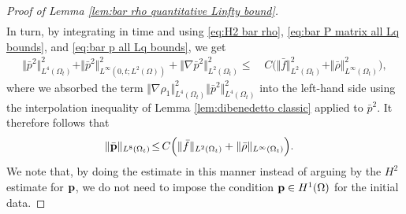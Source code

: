 \documentclass[11pt,a4paper,reqno]{amsart}
\theoremstyle{remark}
\theoremstyle{definition}
\numberwithin{equation}{section}
\newcommand{\p}{{\bf p}}
\begin{document}
\begin{proof}[Proof of Lemma \ref{lem:bar rho quantitative Linfty bound}]
\begin{equation*}
\begin{aligned}
    \end{aligned}
\end{equation*}
In turn, by integrating in time and using \eqref{eq:H2 bar rho}, \eqref{eq:bar P matrix all Lq bounds}, and \eqref{eq:bar p all Lq bounds}, we get 
\begin{equation*}
    \begin{aligned}
      \Vert \bar{p}^2 \Vert_{L^4(\Omega_t)}^2 +  \Vert \bar{p}^2\Vert^2_{L^\infty(0,t;L^2(\Omega))} \!+\! \Vert \nabla \bar{p}^2 \Vert^2_{L^2(\Omega_t)}  \!\leq & \, C \Big( \Vert \bar{f} \Vert_{L^2(\Omega_t)}^2 + \Vert \bar{\rho} \Vert_{L^\infty(\Omega_t)}^2 \Big), 
    \end{aligned}
\end{equation*}
where we absorbed the term $\Vert \nabla \rho_1 \Vert^2_{L^{4}(\Omega_t)} \Vert \bar{p}^2 \Vert_{L^4(\Omega_t)}^2$ into the left-hand side using the interpolation inequality of Lemma \ref{lem:dibenedetto classic} applied to $\bar{p}^2$. It therefore follows that 
\begin{equation}\label{eq:bar p L8 bound}
    \begin{aligned}
      \Vert \bar{\p} \Vert_{L^8(\Omega_t)} \!\leq & \, C \Big( \Vert \bar{f} \Vert_{L^2(\Omega_t)} + \Vert \bar{\rho} \Vert_{L^\infty(\Omega_t)} \Big). 
    \end{aligned}
\end{equation}
We note that, by doing the estimate in this manner instead of arguing by the $H^2$ estimate for $\p$, we do not need to impose the condition $\p \in H^1(\Omega)$ for the initial data. 


\smallskip 


\end{proof}
\end{document}
